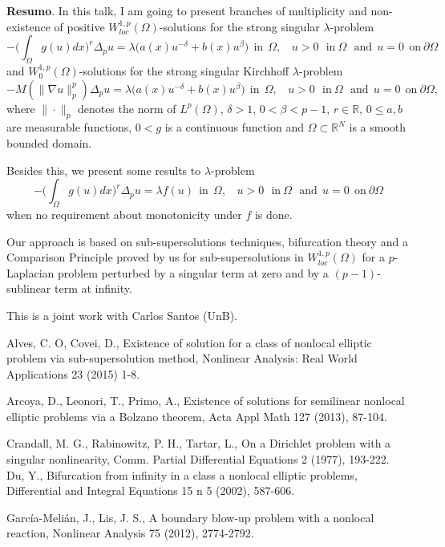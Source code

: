 
	\noindent\textbf{Resumo}.\label{lm} 
	In this talk, I am going to present branches of  multiplicity and non-existence of positive $W^{1,p}_{loc}(\Omega)$-solutions for the strong singular $\lambda$-problem 
	$$
	-{\Big(\int_\Omega g(u)dx\Big)^r}\Delta_pu={\lambda } \Big(a(x)u^{-\delta} + b(x)u^{\beta}\Big)   \ \ \mbox{in} \ \ \Omega, \ \ \ \ u > 0 \ \ \ \mbox{in} \ \Omega \ \ \ \mbox{and} \ \ u=0 \ \ \mbox{on} \ \partial \Omega$$
	and  $W^{1,p}_{0}(\Omega)$-solutions for the strong singular Kirchhoff $\lambda$-problem
	$$
	-M(\parallel \nabla u\parallel_p^p)\Delta_pu={\lambda } \Big(a(x)u^{-\delta} + b(x)u^{\beta}\Big)   \ \ \mbox{in} \ \ \Omega, \ \ \ \ u > 0 \ \ \ \mbox{in} \ \Omega \ \ \ \mbox{and} \ \ u=0 \ \ \mbox{on} \ \partial \Omega, $$
	where $\|\cdot\|_p$ denotes the norm of $L^{p}(\Omega)$, $\delta >1$, $0 <  \beta < p-1$, $r \in \mathbb{R}$, $0\leq a,b$  are measurable  functions, $0<g$ is a continuous function and $\Omega \subset \mathbb{R}^N $  is a smooth bounded domain. 
	
	Besides this, we present some results to  $\lambda$-problem 
	$$
	-{\Big(\int_\Omega g(u)dx\Big)^r}\Delta_pu={\lambda } f(u)  \ \ \mbox{in} \ \ \Omega, \ \ \ \ u > 0 \ \ \ \mbox{in} \ \Omega \ \ \ \mbox{and} \ \ u=0 \ \ \mbox{on} \ \partial \Omega $$ when no requirement about monotonicity under $f$ is done.
	
	Our approach is based on  sub-supersolutions techniques,  bifurcation theory and a Comparison Principle proved by us for sub-supersolutions in  $W^{1,p}_{loc}(\Omega)$ for a $p$-Laplacian problem perturbed by a singular term at zero and by a $(p-1)$-sublinear term at infinity.

	\vspace*{0.5cm} \noindent This is a joint work with Carlos Santos (UnB).
	

\begin{thebibliography}{999}
	 Alves, C. O, Covei, D., Existence of solution for a class of nonlocal elliptic problem via
	sub-supersolution method, Nonlinear Analysis: Real World Applications 23 (2015) 1-8.
	
	 Arcoya, D., Leonori, T., Primo, A., Existence of solutions for semilinear nonlocal elliptic
	problems via a Bolzano theorem, Acta Appl Math 127 (2013), 87-104.
	
	  Crandall, M. G., Rabinowitz,  P. H.,  Tartar, L.,  On a Dirichlet problem with a singular nonlinearity, Comm. Partial Differential Equations  2 (1977), 193-222.
	 Du, Y., Bifurcation from infinity in a class a nonlocal elliptic problems, Differential and
	Integral Equations 15 n 5 (2002), 587-606.
	
	 Garc\'ia-Meli\'an, J., Lis, J. S., A boundary blow-up problem with a nonlocal reaction, Nonlinear Analysis 75 (2012), 2774-2792.
\end{thebibliography}

